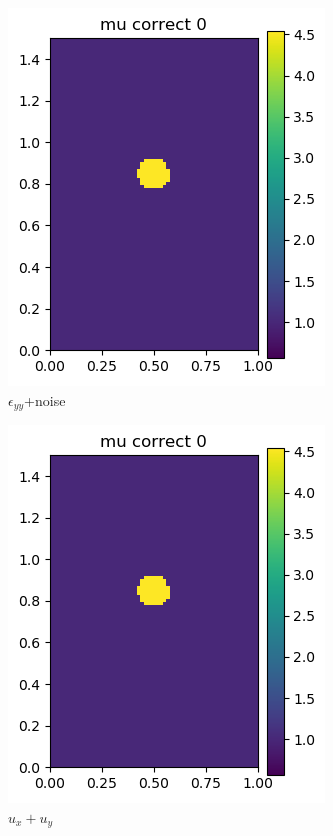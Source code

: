 \documentclass[12pt]{article}
\newcommand{\nhgscalefactor}{0.22}
\newcommand{\nhgfigheight}{3.8cm}
\begin{document}
\begin{figure}
\begin{subfigure}[b]{\nhgscalefactor\linewidth}
     \includegraphics[totalheight=\nhgfigheight]{Figures/strain/ex1/mucomp00.png}
     \caption{$\epsilon_{yy}$+noise}
   \end{subfigure}
   \begin{subfigure}[b]{\nhgscalefactor\linewidth}
     \includegraphics[totalheight=\nhgfigheight]{Figures/strain/ex1/mucomp00.png}
     \caption{$u_x+u_y$}
   \end{subfigure}
   \begin{subfigure}[b]{\nhgscalefactor\linewidth}

\end{subfigure}
\end{figure}
\end{document}

